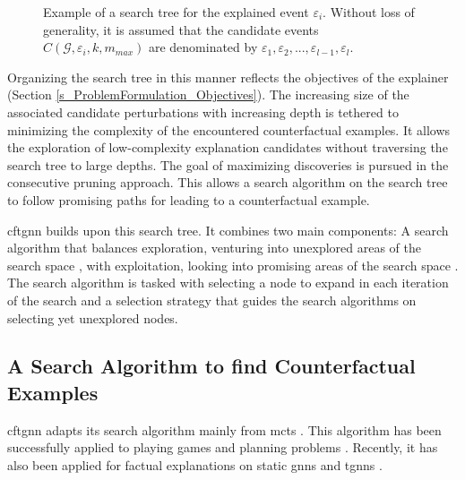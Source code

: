 

\begin{figure} [h]
    \centering
    
    \caption{Example of a search tree for the explained event $\varepsilon_i$. Without loss of generality, it is assumed that the candidate events $C(\mathcal{G}, \varepsilon_i, k, m_{max})$ are denominated by $\varepsilon_1, \varepsilon_2, ..., \varepsilon_{l - 1}, \varepsilon_{l}$.}
    \label{f_SearchTree_Example}
\end{figure}

Organizing the search tree in this manner reflects the objectives of the explainer (Section \ref{s_ProblemFormulation_Objectives}). The increasing size of the associated candidate perturbations with increasing depth is tethered to minimizing the complexity of the encountered counterfactual examples. It allows the exploration of low-complexity explanation candidates without traversing the search tree to large depths. The goal of maximizing discoveries is pursued in the consecutive pruning approach. This allows a search algorithm on the search tree to follow promising paths for leading to a counterfactual example.

\gls{cftgnn} builds upon this search tree. It combines two main components: A search algorithm that balances exploration, venturing into unexplored areas of the search space \cite{browne_survey_2012}, with exploitation, looking into promising areas of the search space \cite{browne_survey_2012}. The search algorithm is tasked with selecting a node to expand in each iteration of the search and a selection strategy that guides the search algorithms on selecting yet unexplored nodes.


\subsection{A Search Algorithm to find Counterfactual Examples}
\label{s_Methodology_Search}
\gls{cftgnn} adapts its search algorithm mainly from \gls{mcts} \cite{kocsis_bandit_2006, silver_mastering_2017}. This algorithm has been successfully applied to playing games \cite{silver_mastering_2017} and planning problems \cite{browne_survey_2012}. Recently, it has also been applied for factual explanations on static \glspl{gnn} \cite{yuan_explainability_2021, zhang_gstarx_2022} and \glspl{tgnn} \cite{xia_explaining_2023}. 

